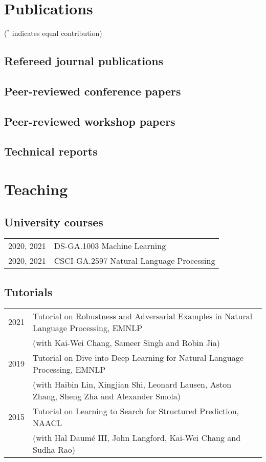 \documentclass[a4paper,11pt]{article}
\begin{document}
\section{Publications}
($^*$ indicates equal contribution)
\subsection{Refereed journal publications}


\subsection{Peer-reviewed conference papers}


\subsection{Peer-reviewed workshop papers}


\subsection{Technical reports}


\section{Teaching} 
\subsection{University courses}
\begin{tabular}{rl}
2020, 2021 & DS-GA.1003 Machine Learning \\
    2020, 2021 & CSCI-GA.2597 Natural Language Processing
\end{tabular}

\subsection{Tutorials}
\begin{tabular}{rl}
    2021 & Tutorial on Robustness and Adversarial Examples in Natural Language Processing, EMNLP\\
         & (with Kai-Wei Chang, Sameer Singh and Robin Jia) \\
    2019 & Tutorial on Dive into Deep Learning for Natural Language Processing, EMNLP \\
         & (with Haibin Lin, Xingjian Shi, Leonard Lausen, Aston Zhang, Sheng Zha and Alexander Smola) \\
    2015 & Tutorial on Learning to Search for Structured Prediction, NAACL \\
         & (with Hal Daum\'e III, John Langford, Kai-Wei Chang and Sudha Rao)
\end{tabular}
\end{document}
